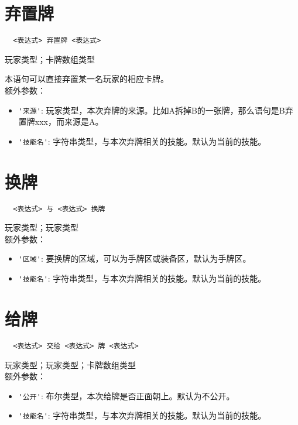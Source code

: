 \section{弃置牌}

\begin{verbatim}
  <表达式> 弃置牌 <表达式>
\end{verbatim}

玩家类型；卡牌数组类型

本语句可以直接弃置某一名玩家的相应卡牌。 \\

额外参数：

\begin{itemize}
  \item \verb|'来源'|: 玩家类型，本次弃牌的来源。比如A拆掉B的一张牌，那么语句是B弃置牌xxx，而来源是A。
  \item \verb|'技能名'|: 字符串类型，与本次弃牌相关的技能。默认为当前的技能。
\end{itemize}

\section{换牌}

\begin{verbatim}
  <表达式> 与 <表达式> 换牌
\end{verbatim}

玩家类型；玩家类型 \\

额外参数：

\begin{itemize}
  \item \verb|'区域'|: 要换牌的区域，可以为手牌区或装备区，默认为手牌区。
  \item \verb|'技能名'|: 字符串类型，与本次弃牌相关的技能。默认为当前的技能。
\end{itemize}

\section{给牌}

\begin{verbatim}
  <表达式> 交给 <表达式> 牌 <表达式>
\end{verbatim}

玩家类型；玩家类型；卡牌数组类型 \\

额外参数：

\begin{itemize}
  \item \verb|'公开'|: 布尔类型，本次给牌是否正面朝上。默认为不公开。
  \item \verb|'技能名'|: 字符串类型，与本次弃牌相关的技能。默认为当前的技能。
\end{itemize}

